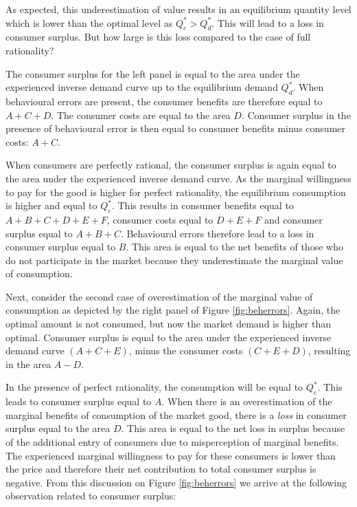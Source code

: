 \documentclass[
]{book}
\begin{document}
As expected, this underestimation of value results in an equilibrium quantity level which is lower than the optimal level as \(Q^*_e > Q^*_d\). This will lead to a loss in consumer surplus. But how large is this loss compared to the case of full rationality?

The consumer surplus for the left panel is equal to the area under the experienced inverse demand curve up to the equilibrium demand \(Q^*_d\). When behavioural errors are present, the consumer benefits are therefore equal to \(A+C+D\). The consumer costs are equal to the area \(D\). Consumer surplus in the presence of behavioural error is then equal to consumer benefits minus consumer costs: \(A+C\).

When consumers are perfectly rational, the consumer surplus is again equal to the area under the experienced inverse demand curve. As the marginal willingness to pay for the good is higher for perfect rationality, the equilibrium consumption is higher and equal to \(Q^*_e\). This results in consumer benefits equal to \(A+B+C+D+E+F\), consumer costs equal to \(D+E+F\) and consumer surplus equal to \(A+B+C\). Behavioural errors therefore lead to a loss in consumer surplus equal to \(B\). This area is equal to the net benefits of those who do not participate in the market because they underestimate the marginal value of consumption.

Next, consider the second case of overestimation of the marginal value of consumption as depicted by the right panel of Figure \ref{fig:beherrors}. Again, the optimal amount is not consumed, but now the market demand is higher than optimal. Consumer surplus is equal to the area under the experienced inverse demand curve \((A+C+E)\), minus the consumer costs \((C+E+D)\), resulting in the area \(A-D\).

In the presence of perfect rationality, the consumption will be equal to \(Q^*_e\). This leads to consumer surplus equal to \(A\). When there is an overestimation of the marginal benefits of consumption of the market good, there is a \emph{loss} in consumer surplus equal to the area \(D\). This area is equal to the net loss in surplus because of the additional entry of consumers due to misperception of marginal benefits. The experienced marginal willingness to pay for these consumers is lower than the price and therefore their net contribution to total consumer surplus is negative. From this discussion on Figure \ref{fig:beherrors} we arrive at the following observation related to consumer surplus:
\end{document}
